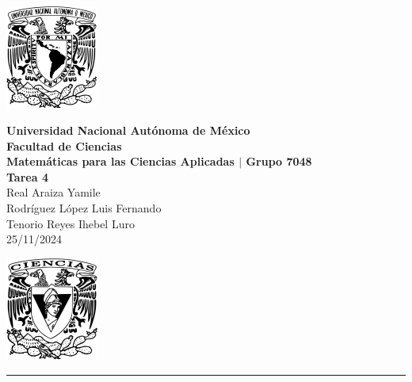 \documentclass[11pt,letterpaper]{article}
\begin{document}

\begin{center}
    \begin{minipage}{3cm}
    	\begin{center}
    		\includegraphics[height=3.4cm]{./imagenes/logo_unam.png}
    	\end{center}
    \end{minipage}\hfill
    \begin{minipage}{10cm}
    	\begin{center}
    	\textbf{\large Universidad Nacional Autónoma de México}\\[0.1cm]
        \textbf{Facultad de Ciencias}\\[0.1cm]
        \textbf{Matemáticas para las Ciencias Aplicadas $|$ Grupo 7048}\\[0.1cm]
        \textbf{Tarea 4 }\\[0.1cm]
        Real Araiza Yamile\\[0.1cm]
        Rodríguez López Luis Fernando\\[0.1cm]
        Tenorio Reyes Ihebel Luro\\[0.1cm]
        25/11/2024
    	\end{center}
    \end{minipage}\hfill
    \begin{minipage}{3cm}
    	\begin{center}
    		\includegraphics[height=3.4cm]{./imagenes/Logo_FC.png}
    	\end{center}
    \end{minipage}
\end{center}

\rule{17cm}{0.1mm}

\end{document}
